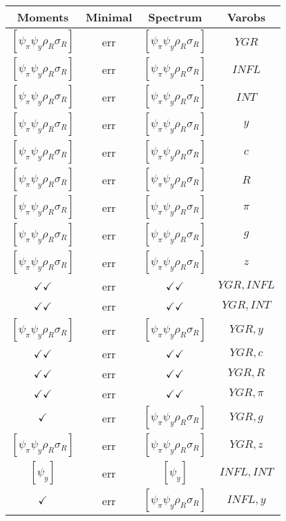 \documentclass[a4paper,10pt]{article}
\begin{document}
\centering
\begin{longtable}{|c|c|c|c|}
\hline
Moments & Minimal & Spectrum & Varobs \\
\hline
$[\psi_\pi \psi_y \rho_R \sigma_R ]$ & err & $[\psi_\pi \psi_y \rho_R \sigma_R ]$ & ${YGR}$ \\
\hline
$[\psi_\pi \psi_y \rho_R \sigma_R ]$ & err & $[\psi_\pi \psi_y \rho_R \sigma_R ]$ & ${INFL}$ \\
\hline
$[\psi_\pi \psi_y \rho_R \sigma_R ]$ & err & $[\psi_\pi \psi_y \rho_R \sigma_R ]$ & ${INT}$ \\
\hline
$[\psi_\pi \psi_y \rho_R \sigma_R ]$ & err & $[\psi_\pi \psi_y \rho_R \sigma_R ]$ & ${y}$ \\
\hline
$[\psi_\pi \psi_y \rho_R \sigma_R ]$ & err & $[\psi_\pi \psi_y \rho_R \sigma_R ]$ & ${c}$ \\
\hline
$[\psi_\pi \psi_y \rho_R \sigma_R ]$ & err & $[\psi_\pi \psi_y \rho_R \sigma_R ]$ & ${R}$ \\
\hline
$[\psi_\pi \psi_y \rho_R \sigma_R ]$ & err & $[\psi_\pi \psi_y \rho_R \sigma_R ]$ & ${\pi}$ \\
\hline
$[\psi_\pi \psi_y \rho_R \sigma_R ]$ & err & $[\psi_\pi \psi_y \rho_R \sigma_R ]$ & ${g}$ \\
\hline
$[\psi_\pi \psi_y \rho_R \sigma_R ]$ & err & $[\psi_\pi \psi_y \rho_R \sigma_R ]$ & ${z}$ \\
\hline
$\checkmark\checkmark$ & err & $\checkmark\checkmark$ & ${YGR},{INFL}$ \\
\hline
$\checkmark\checkmark$ & err & $\checkmark\checkmark$ & ${YGR},{INT}$ \\
\hline
$[\psi_\pi \psi_y \rho_R \sigma_R ]$ & err & $[\psi_\pi \psi_y \rho_R \sigma_R ]$ & ${YGR},{y}$ \\
\hline
$\checkmark\checkmark$ & err & $\checkmark\checkmark$ & ${YGR},{c}$ \\
\hline
$\checkmark\checkmark$ & err & $\checkmark\checkmark$ & ${YGR},{R}$ \\
\hline
$\checkmark\checkmark$ & err & $\checkmark\checkmark$ & ${YGR},{\pi}$ \\
\hline
$\checkmark$ & err & $[\psi_\pi \psi_y \rho_R \sigma_R ]$ & ${YGR},{g}$ \\
\hline
$[\psi_\pi \psi_y \rho_R \sigma_R ]$ & err & $[\psi_\pi \psi_y \rho_R \sigma_R ]$ & ${YGR},{z}$ \\
\hline
$[\psi_y ]$ & err & $[\psi_y ]$ & ${INFL},{INT}$ \\
\hline
$\checkmark$ & err & $[\psi_\pi \psi_y \rho_R \sigma_R ]$ & ${INFL},{y}$ \\

\end{longtable}
\end{document}
